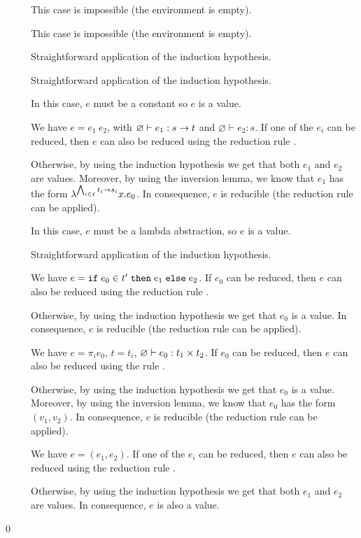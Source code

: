 \documentclass[a4paper]{article}
\theoremstyle{definition}
\begin{document}
      \begin{description}
        \item[] This case is impossible (the environment is empty).
        \item[] This case is impossible (the environment is empty).
        \item[] Straightforward application of the induction hypothesis.
        \item[] Straightforward application of the induction hypothesis.
        \item[] In this case, $e$ must be a constant so $e$ is a value.
        \item[] We have $e=e_1\ e_2$, with $\varnothing \vdash e_1: s\to t$
        and $\varnothing \vdash e_2 : s$. If one of the $e_i$ can be reduced, then
        $e$ can also be reduced using the reduction rule .
        
        Otherwise, by using the induction hypothesis we get that both $e_1$ and $e_2$ are values.
        Moreover, by using the inversion lemma, we know that $e_1$ has the form
        $\lambda^{\bigwedge_{i\in I} t_i\to s_i}x.e_0$. In consequence, $e$ is reducible
        (the reduction rule  can be applied).
        \item[] In this case, $e$ must be a lambda abstraction, so $e$ is a value.
        \item[] Straightforward application of the induction hypothesis.
        \item[] We have $e = \texttt{if}\;e_0\in t'\;\texttt{then}\;e_1\;\texttt{else}\;e_2$. If $e_0$ can be reduced,
        then $e$ can also be reduced using the reduction rule .

        Otherwise, by using the induction hypothesis we get that $e_0$ is a value.
        In consequence, $e$ is reducible (the reduction rule  can be applied).
        \item[] We have $e=\pi_i e_0$, $t=t_i$, $\varnothing \vdash e_0: t_1\times t_2$.
        If $e_0$ can be reduced, then $e$ can also be reduced using the rule .
        
        Otherwise, by using the induction hypothesis we get that $e_0$ is a value.
        Moreover, by using the inversion lemma, we know that $e_0$ has the form $(v_1, v_2)$.
        In consequence, $e$ is reducible (the reduction rule  can be applied).
        \item[] We have $e=(e_1,e_2)$. If one of the $e_i$ can be reduced, then
        $e$ can also be reduced using the reduction rule .

        Otherwise, by using the induction hypothesis we get that both $e_1$ and $e_2$ are values.
        In consequence, $e$ is also a value.
      \end{description}

      \qed
\end{document}
